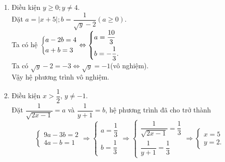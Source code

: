 \begin{bt}
{\begin{enumerate}
			Đặt $u=\dfrac{1}{x-2}$ và $v=\dfrac{1}{y+1}$, hệ phương trình đã cho trở thành
			\begin{equation*}
			\left\{\begin{aligned} & 2u+v=3 \\& 3u-2v=8 \end{aligned}\right.
			\Leftrightarrow  \left\{\begin{aligned} & 4u+2v=6 \\& 3u-2v=8\end{aligned}\right.
			\Leftrightarrow  \left\{\begin{aligned} & 7u=14 \\& v=3-2u\end{aligned}\right.
			\Leftrightarrow  \left\{\begin{aligned} & u=2 \\& v=-1.\end{aligned}\right.
			\end{equation*}
			Như vậy ta được
			\begin{equation*}
			\left\{\begin{aligned} & \dfrac{1}{x-2}=2 \\& \dfrac{1}{y+1}=-1\end{aligned}\right. \Leftrightarrow \left\{\begin{aligned} & x=\dfrac{5}{2} \\& y=-2.\end{aligned}\right. \text{ (thỏa mãn điều kiện xác định)}
			\end{equation*}
			Vậy hệ phương trình đã cho có nghiệm duy nhất $(x;y)=\left(\dfrac{5}{2};-2\right)$. 
			\item Điều kiện $y\geq 0;y\ne 4$.\\
			Đặt $a=\vert x+5\vert;b=\dfrac{1}{\sqrt{y}-2}(a\geq 0)$.\\
			Ta có hệ $\left\{\begin{aligned}&a-2b=4\\&a+b=3\end{aligned}\right.\Leftrightarrow \left\{\begin{aligned}&a=\dfrac{10}{3}\\&b=-\dfrac{1}{3}.\end{aligned}\right.$\\
			Ta có $\sqrt{y}-2=-3\Leftrightarrow\sqrt{y}=-1$(vô nghiệm).\\
			Vậy hệ phương trình vô nghiệm.
			\item Điều kiện $x>\dfrac{1}{2}$, $y\ne -1$.\\
			Đặt $\dfrac{1}{\sqrt{2x-1}}=a$ và $\dfrac{1}{y+1}=b$, hệ phương trình đã cho trở thành $$\begin{cases}9a-3b=2\\ 4a-b=1\end{cases}\Rightarrow \begin{cases}a=\dfrac{1}{3}\\ b=\dfrac{1}{3}\end{cases}\Rightarrow \begin{cases}\dfrac{1}{\sqrt{2x-1}}=\dfrac{1}{3}\\ \dfrac{1}{y+1}=\dfrac{1}{3}\end{cases}\Rightarrow \begin{cases}x=5\\ y=2.\end{cases}$$

\end{enumerate}}
\end{bt}
